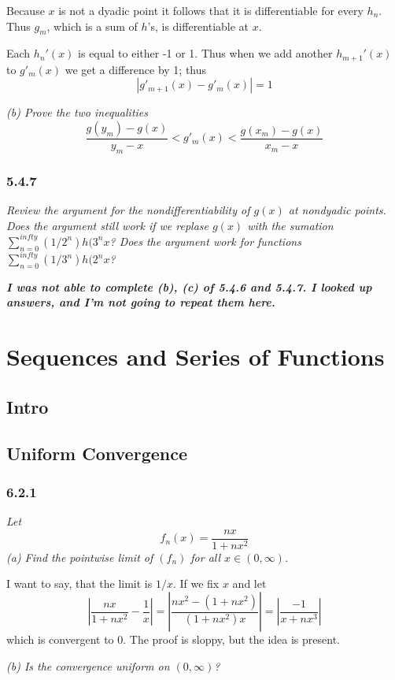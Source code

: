 \documentclass[11pt,oneside,titlepage]{book}
\begin{document}
Because $x$ is not a dyadic point it follows that it is differentiable for
every $h_n$. Thus $g_m$, which is a sum of $h$'s, is differentiable at $x$.

Each $h_n'(x)$ is equal to either -1 or 1. Thus when we add another
$h_{m + 1}'(x)$ to $g'_m(x)$ we get a difference by 1; thus
$$|g'_{m + 1}(x) - g'_m(x)| = 1$$

\textit{(b) Prove the two inequalities}
$$\frac{g(y_m) - g(x)}{y_m - x} < g'_m(x) < \frac{g(x_m) - g(x)}{x_m - x}$$

\subsection*{5.4.7}
\textit{Review the argument for the nondifferentiability of $g(x)$ at
  nondyadic points. Does the argument still work if we replase $g(x)$ with
  the sumation $\sum_{n =0}^{infty}{(1/2^n)h(3^n x}$? Does the argument work
  for functions $\sum_{n =0}^{infty}{(1/3^n)h(2^n x}$?}


\textbf{\textit{I was not able to complete (b), (c) of 5.4.6 and 5.4.7.
    I looked up answers, and I'm not going to repeat them here.}}

\chapter{Sequences and Series of Functions}

\section{Intro}

\section{Uniform Convergence}

\subsection*{6.2.1}
\textit{Let}
$$f_n(x) = \frac{nx}{1 + nx^2}$$
\textit{(a) Find the pointwise limit of $(f_n)$ for all $x \in (0, \infty)$.}

I want to say, that the limit is $1/x$. If we fix $x$ and
let
$$\left|\frac{nx}{1 + nx^2} - \frac{1}{x}\right| =
\left|\frac{nx^2 - (1 + nx^2)}{(1 + nx^2)x} \right| =
\left|\frac{-1}{x + nx^3} \right|
$$
which is convergent to 0. The proof is sloppy, but the idea is present.

\textit{(b) Is the convergence uniform on $(0, \infty)$?}
\end{document}
